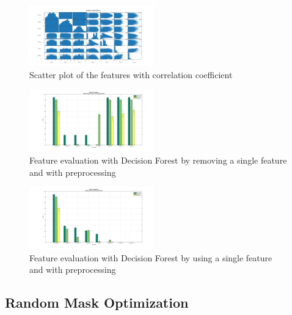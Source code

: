 \documentclass[journal]{IEEEtran}
\begin{document}
\begin{figure}
	\centering
	\includegraphics[width=0.48\textwidth]{images/ScatterPlotMatrix}
	\caption{Scatter plot of the features with correlation coefficient}
	\label{scatterplot}
\end{figure}


\begin{figure}
	\centering
	\includegraphics[width=0.48\textwidth]{images/DF_FE_WSF_PP}
	\caption{Feature evaluation with Decision Forest by removing a single feature and with preprocessing}
	\label{DF_FeatEval_WSF_PP}
\end{figure}


\begin{figure}
	\centering
	\includegraphics[width=0.48\textwidth]{images/DF_FE_SF_PP}
	\caption{Feature evaluation with Decision Forest by using a single feature and with preprocessing }
	\label{DF_FeatEval_SF_PP}
\end{figure}



\subsection{Random Mask Optimization}
\end{document}
